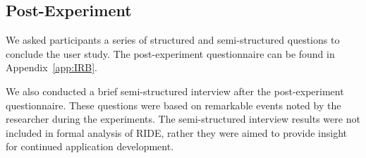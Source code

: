 
\subsection{Post-Experiment} %
\label{sub:post_experiment}
We asked participants a series of structured and semi-structured questions to conclude the user study. The post-experiment questionnaire can be found in Appendix~\ref{app:IRB}.

We also conducted a brief semi-structured interview after the post-experiment questionnaire. These questions were based on remarkable events noted by the researcher during the experiments. The semi-structured interview results were not included in formal analysis of RIDE, rather they were aimed to provide insight for continued application development.
